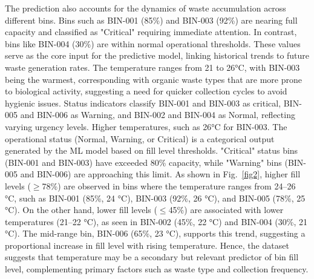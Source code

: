 \documentclass[final,5p,times,twocolumn]{elsarticle}
\begin{document}
The prediction also accounts for the dynamics of waste accumulation across different bins. Bins such as BIN-001 (85\%) and BIN-003 (92\%) are nearing full capacity and classified as "Critical" requiring immediate attention. In contrast, bins like BIN-004 (30\%) are within normal operational thresholds. These values serve as the core input for the predictive model, linking historical trends to future waste generation rates. The temperature ranges from 21 to 26°C, with BIN-003 being the warmest, corresponding with organic waste types that are more prone to biological activity, suggesting a need for quicker collection cycles to avoid hygienic issues. Status indicators classify BIN-001 and BIN-003 as critical, BIN-005 and BIN-006 as Warning, and BIN-002 and BIN-004 as Normal, reflecting varying urgency levels. Higher temperatures, such as 26°C for BIN-003. The operational status (Normal, Warning, or Critical) is a categorical output generated by the ML model based on fill level thresholds. "Critical" status bins (BIN-001 and BIN-003) have exceeded 80\% capacity, while "Warning" bins (BIN-005 and BIN-006) are approaching this limit. As shown in Fig.~\ref{fig2}, higher fill levels ($\geq$78\%) are observed in bins where the temperature ranges from 24--26 °C, such as BIN-001 (85\%, 24 °C), BIN-003 (92\%, 26 °C), and BIN-005 (78\%, 25 °C). On the other hand, lower fill levels ($\leq$45\%) are associated with lower temperatures (21--22 °C), as seen in BIN-002 (45\%, 22 °C) and BIN-004 (30\%, 21 °C). The mid-range bin, BIN-006 (65\%, 23 °C), supports this trend, suggesting a proportional increase in fill level with rising temperature. Hence, the dataset suggests that temperature may be a secondary but relevant predictor of bin fill level, complementing primary factors such as waste type and collection frequency.
\end{document}
